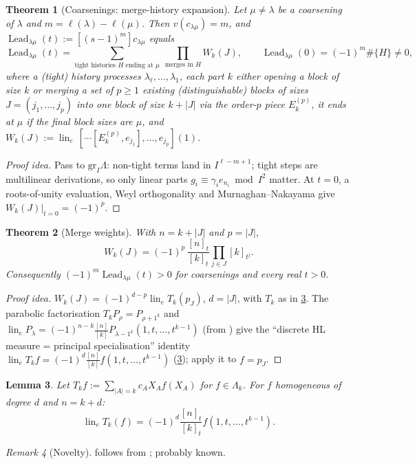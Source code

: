 \documentclass[submission]{FPSAC2027}
\newtheorem{theorem}{Theorem}[section]
\newtheorem{lemma}[theorem]{Lemma}
\theoremstyle{definition}
\theoremstyle{remark}
\newtheorem{remark}[theorem]{Remark}
\newcommand{\lin}{\operatorname{lin}_e}
\newcommand{\Lead}{\operatorname{Lead}}
\newcommand{\val}{v}
\newcommand{\Lam}{\Lambda}
\begin{document}
\begin{theorem}[Coarsenings: merge-history expansion]\label{thm:coarse}
Let $\mu\neq\lambda$ be a coarsening of $\lambda$ and $m=\ell(\lambda)-\ell(\mu)$. Then $\val(c_{\lambda\mu})=m$, and $\Lead_{\lambda\mu}(t):=[(s-1)^m]c_{\lambda\mu}$ equals
\[ \Lead_{\lambda\mu}(t)=\sum_{\text{tight histories }H\text{ ending at }\mu}\ \prod_{\text{merges in }H}W_k(J),\qquad \Lead_{\lambda\mu}(0)=(-1)^m\#\{H\}\neq0, \]
where a (tight) history processes $\lambda_\ell,\dots,\lambda_1$, each part $k$ either opening a block of size $k$ or merging a set of $p\ge1$ existing (distinguishable) blocks of sizes $J=(j_1,\dots,j_p)$ into one block of size $k+|J|$ via the order-$p$ piece $E_k^{(p)}$, it ends at $\mu$ if the final block sizes are $\mu$, and $W_k(J):=\lin\,[\cdots[E_k^{(p)},e_{j_1}],\dots,e_{j_p}](1)$.
\end{theorem}
\begin{proof}[Proof idea]
Pass to $\mathrm{gr}_I\Lam$: non-tight terms land in $I^{\ell-m+1}$; tight steps are multilinear derivations, so only linear parts $g_i\equiv\gamma_ie_{n_i}\bmod I^2$ matter. At $t=0$, a roots-of-unity evaluation, Weyl orthogonality and Murnaghan--Nakayama give $W_k(J)|_{t=0}=(-1)^p$.
\end{proof}

\begin{theorem}[Merge weights]\label{thm:W}
With $n=k+|J|$ and $p=|J|$,
\[ W_k(J)=(-1)^{p}\,\frac{[n]_t}{[k]_t}\prod_{j\in J}[k]_{t^{j}}. \]
Consequently $(-1)^m\Lead_{\lambda\mu}(t)>0$ for coarsenings and every real $t>0$.
\end{theorem}
\begin{proof}[Proof idea]
$W_k(J)=(-1)^{d-p}\lin T_k(p_J)$, $d=|J|$, with $T_k$ as in \cref{lem:linT}. The parabolic factorisation $T_kP_\rho=P_{\rho+1^k}$ \cite[III (2.2)]{Macdonald95} and $\lin P_\lambda=(-1)^{n-k}\frac{[n]}{[k]}P_{\lambda-1^k}(1,t,\dots,t^{k-1})$ (from \cite[III.7 Ex.~2, III.2 Ex.~1]{Macdonald95}) give the ``discrete HL measure = principal specialisation'' identity $\lin T_k f=(-1)^d\frac{[n]}{[k]}f(1,t,\dots,t^{k-1})$ (\cref{lem:linT}); apply it to $f=p_J$.
\end{proof}
\begin{lemma}\label{lem:linT}
Let $T_kf:=\sum_{|A|=k}c_AX_Af(X_A)$ for $f\in\Lam_k$. For $f$ homogeneous of degree $d$ and $n=k+d$: \[\lin T_k(f)=(-1)^d\frac{[n]_t}{[k]_t}f(1,t,\dots,t^{k-1}).\]
\end{lemma}
\begin{remark}[Novelty]
 follows from \cite[III.7 Ex.~2, III (2.2)]{Macdonald95}; probably known.
\end{remark}
\end{document}
